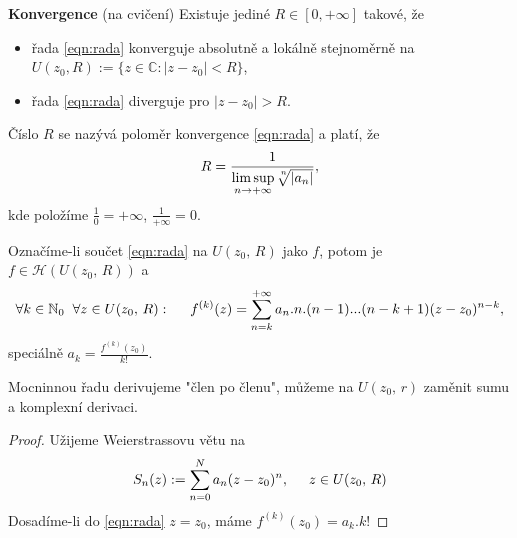 \begin{properties}
 \textbf{Konvergence} (na cvičení) \newline
Existuje jediné $R\in{[0,+\infty]}$ takové, že 
\begin{itemize}
    \item řada \cref{eqn:rada} konverguje absolutně a lokálně stejnoměrně na  $U(z_0,R):=\{z\in\mathbb{C} : |z-z_0|<R\}$, 
    \item řada \cref{eqn:rada} diverguje pro $|z-z_0|>R$. 
\end{itemize}
Číslo $R$ se nazývá poloměr konvergence \cref{eqn:rada} a platí, že
\[R=\frac{1}{
\underset{n\to+\infty}{\limsup}{\sqrt[\leftroot{-3}\uproot{3}n]{|a_n|}}},\]
kde položíme $\frac{1}{0}=+\infty$, $\frac{1}{+\infty}=0$.

 Označíme-li součet \cref{eqn:rada} na $U(z_0,\, R)$ jako $f$, potom je $f\in\mathcal{H}(U(z_0,\, R))$ a 
\[
\forall{k\in\mathbb{N}_0}\hspace{2mm}\forall{z\in{U(z_0,\,R)}}: \hspace{5mm}
f^{(k)}(z)=
\sum_{n=k}^{+\infty}{a_n.n.(n-1)...(n-k+1)(z-z_0)^{n-k}},\]
speciálně $a_k=\frac{f^{(k)}(z_0)}{k!}$.
\end{properties}

\begin{note}
Mocninnou řadu derivujeme "člen po členu", můžeme na $U(z_0,\,r)$ zaměnit sumu a komplexní derivaci.
\end{note}

\begin{proof}
Užijeme Weierstrassovu větu na 
\[S_n(z):=\sum_{n=0}^N{a_n(z-z_0)^n},\hspace{5mm} z\in{U(z_0,\,R)}\]
Dosadíme-li do \cref{eqn:rada} $z=z_0$, máme $f^{(k)}(z_0)={a_k}.{k!}$
\end{proof}